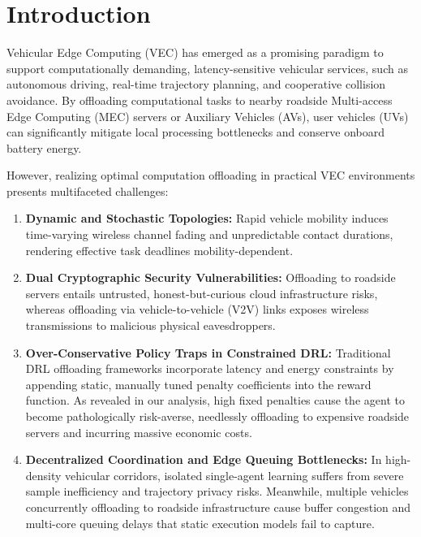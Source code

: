 \documentclass[12pt,a4paper]{article}
\begin{document}
\section{Introduction}
Vehicular Edge Computing (VEC) has emerged as a promising paradigm to support computationally demanding, latency-sensitive vehicular services, such as autonomous driving, real-time trajectory planning, and cooperative collision avoidance. By offloading computational tasks to nearby roadside Multi-access Edge Computing (MEC) servers or Auxiliary Vehicles (AVs), user vehicles (UVs) can significantly mitigate local processing bottlenecks and conserve onboard battery energy.

However, realizing optimal computation offloading in practical VEC environments presents multifaceted challenges:
\begin{enumerate}
    \item \textbf{Dynamic and Stochastic Topologies:} Rapid vehicle mobility induces time-varying wireless channel fading and unpredictable contact durations, rendering effective task deadlines mobility-dependent.
    \item \textbf{Dual Cryptographic Security Vulnerabilities:} Offloading to roadside servers entails untrusted, honest-but-curious cloud infrastructure risks, whereas offloading via vehicle-to-vehicle (V2V) links exposes wireless transmissions to malicious physical eavesdroppers.
    \item \textbf{Over-Conservative Policy Traps in Constrained DRL:} Traditional DRL offloading frameworks incorporate latency and energy constraints by appending static, manually tuned penalty coefficients into the reward function. As revealed in our analysis, high fixed penalties cause the agent to become pathologically risk-averse, needlessly offloading to expensive roadside servers and incurring massive economic costs.
    \item \textbf{Decentralized Coordination and Edge Queuing Bottlenecks:} In high-density vehicular corridors, isolated single-agent learning suffers from severe sample inefficiency and trajectory privacy risks. Meanwhile, multiple vehicles concurrently offloading to roadside infrastructure cause buffer congestion and multi-core queuing delays that static execution models fail to capture.
\end{enumerate}
\end{document}
